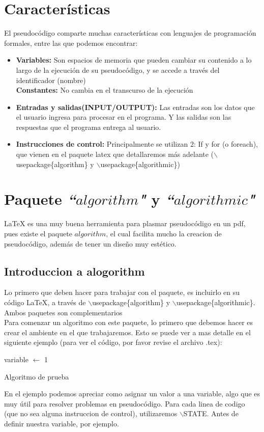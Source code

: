 \documentclass[letterpaper,12pt]{article}
\begin{document}
\section{Características}
El pseudocódigo comparte muchas características con lenguajes de programación formales, entre las que podemos encontrar:
\begin{itemize}
    \item \textbf{Variables: } Son espacios de memoria que pueden cambiar su contenido a lo largo de la ejecución de su pseudocódigo, y se accede a través del identificador (nombre)\\[0.1cm]
    \textbf{Constantes: } No cambia en el transcurso de la ejecución
    \item \textbf{Entradas y salidas(INPUT/OUTPUT): } Las entradas son los datos que el usuario
    ingresa para procesar en el programa. Y las salidas son las respuestas que el
    programa entrega al usuario.
    \item \textbf{Instrucciones de control: } Principalmente se utilizan 2: If y for (o foreach), que vienen en el paquete latex que detallaremos más adelante ($\backslash$usepackage\{algorithm\} y $\backslash$usepackage\{algorithmic\})
\end{itemize}
\vspace{5cm}
\section{Paquete \textit{``$algorithm$"} y \textit{``$algorithmic$"}}
{\LaTeX} es una muy buena herramienta para plasmar pseudocódigo en un pdf, pues existe el paquete $algorithm$, el cual facilita mucho la creacion de pseudocódigo, además de tener un diseño muy estético.
\subsection{Introduccion a alogorithm}
Lo primero que deben hacer para trabajar con el paquete, es incluirlo en su código {\LaTeX}, a través de $\backslash$usepackage\{algorithm\} y $\backslash$usepackage\{algorithmic\}. Ambos paquetes son complementarios\\[0.1cm]
Para comenzar un algoritmo con este paquete, lo primero que debemos hacer es crear el ambiente en el que trabajaremos. Esto se puede ver a mas detalle en el siguiente ejemplo (para ver el código, por favor revise el archivo .tex): 
\begin{algorithm}[H]
  \begin{algorithmic}[1]
        \STATE variable $\leftarrow$ 1
        
  \end{algorithmic}
  \caption{Algoritmo de prueba}
  \label{alg:SDSA}
\end{algorithm}
En el ejemplo podemos apreciar como asignar un valor a una variable, algo que es muy útil para resolver problemas en pseudocódigo. Para cada linea de codigo (que no sea alguna instruccion de control), utilizaremos $\backslash$STATE. Antes de definir nuestra variable, por ejemplo.\\[0.1cm]
\end{document}

